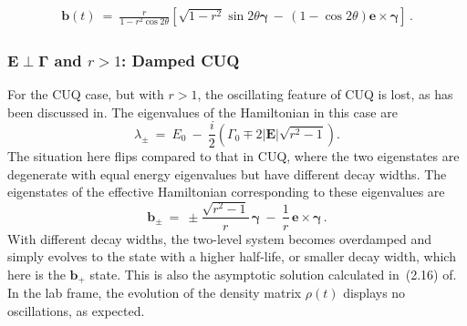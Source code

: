 \documentclass[12pt,a4paper]{article}
\begin{document}
\begin{equation}
    \begin{aligned}
        \mathbf{b}(t)\: =\: \frac{r}{1-r^2\cos{2\theta}}\left[\sqrt{1-r^2}\sin{2\theta}\boldsymbol{\gamma}\, -\, (1-\cos{2\theta})\mathbf{e}\times \boldsymbol{\gamma}\right]\,.
    \end{aligned}\label{max_mix_CUQ_sol}
\end{equation}


\subsubsection{$\mathbf{E}\perp\mathbf{\Gamma}$ and $r>1$: Damped CUQ}

For the CUQ case, but with $r>1$, the oscillating feature of CUQ is lost, as has been discussed in\cite{Karamitros:2022oew}. The eigenvalues of the Hamiltonian in this case are
\begin{equation}
    \lambda_{\pm}\: =\ E_0\: -\: \frac{i}{2}\left(\Gamma_0 \mp 2|\mathbf{E}|\sqrt{r^2-1}\right).
\end{equation}
The situation here flips compared to that in CUQ, where the two eigenstates are degenerate with equal energy eigenvalues but have different decay widths. The eigenstates of the effective Hamiltonian corresponding to these eigenvalues are
\begin{equation}
    \mathbf{b}_{\pm}\: =\ \pm\dfrac{\sqrt{r^2-1}}{r}\,\boldsymbol{\gamma}\:-\:\dfrac{1}{r}\,\mathbf{e}\times\boldsymbol{\gamma}\,.
\end{equation}
With different decay widths, the two-level system becomes overdamped and simply evolves to the state with a higher half-life, or smaller decay width, which here is the $\mathbf{b}_+$ state. This is also the asymptotic solution calculated in~(2.16) of\cite{Karamitros:2022oew}. In the lab frame, the evolution of the density matrix $\rho(t)$ displays no oscillations, as expected.
\end{document}
